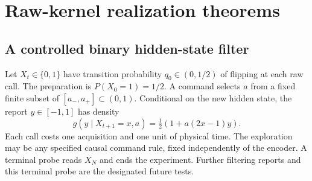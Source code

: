 \section{Raw-kernel realization theorems}\label{sec:realizations}
\subsection{A controlled binary hidden-state filter}\label{sec:filter}
Let $X_t\in\{0,1\}$ have transition probability $q_0\in(0,1/2)$ of flipping at each raw call. The preparation is $P(X_0=1)=1/2$. A command selects $a$ from a fixed finite subset of $[a_-,a_+]\subset(0,1)$. Conditional on the new hidden state, the report $y\in[-1,1]$ has density
\begin{equation}\label{eq:hmm-kernel}
 g(y\mid X_{t+1}=x,a)=\tfrac12(1+a(2x-1)y).
\end{equation}
Each call costs one acquisition and one unit of physical time. The exploration may be any specified causal command rule, fixed independently of the encoder. A terminal probe reads $X_N$ and ends the experiment. Further filtering reports and this terminal probe are the designated future tests.

